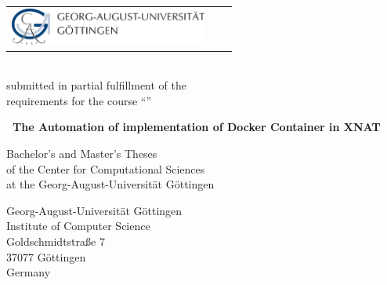 %
%

\begin{titlepage}
    \normalsize
    \begin{tabularx}{\textwidth}{lXr}
        \multirow{2}{*}{\includegraphics[width=6.5cm]{images/goe-logo.jpg}} 
        & & \\
    \end{tabularx}

    \large
    \centering

    \vspace{3cm}

    \textbf{\LARGE \mytype}\\

    submitted in partial fulfillment of the\\
    requirements for the course ``\mycourse''

    \vspace{2cm}

    \textbf{\LARGE \ The Automation of implementation of Docker Container in XNAT}

    \vspace{2cm}

    \myauthor{ }

    \vspace{2cm}

    \mydepartment

    \vspace{2cm}

    Bachelor's and Master's Theses\\
    of the Center for Computational Sciences\\
    at the Georg-August-Universität Göttingen

    \vspace{0.2cm}

    \mysubmissiondate


    \myemptypage
    \clearpage
    \thispagestyle{empty}
    \null
    \flushleft
    \onehalfspacing
    \normalsize

    \vspace{12cm}

    Georg-August-Universität Göttingen\\
    Institute of Computer Science\\[3ex]
    Goldschmidtstraße 7\\
    37077 Göttingen\\
    Germany\\[3ex]


\end{titlepage}
